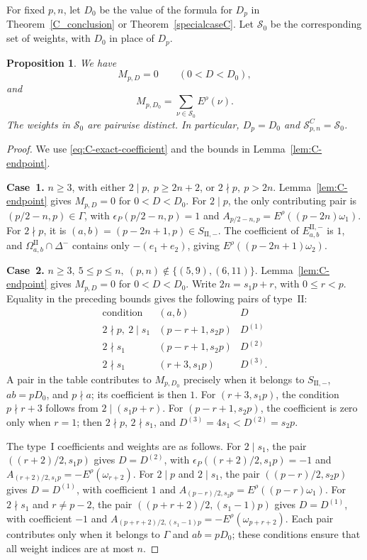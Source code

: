 \documentclass[11pt,a4paper]{amsart}
\theoremstyle{plain}
\newtheorem{prop}[theorem]{Proposition}
\numberwithin{equation}{section}
\newenvironment{pf}{\begin{proof}}{\end{proof}}
\begin{document}
For fixed \(p,n\), let \(D_0\) be the value of the formula for
\(D_p\) in Theorem~\ref{C_conclusion} or Theorem~\ref{specialcaseC}.
Let \(\mathcal S_0\) be the corresponding set of weights, with
\(D_0\) in place of \(D_p\).
\begin{prop}
	\label{prop:C-first-layer}
	We have
	\[
	M_{p,D}=0\qquad(0<D<D_0),
	\]
	and
	\[
	M_{p,D_0}
	=\sum_{\nu\in\mathcal S_0}E^\rho(\nu).
	\]
	The weights in \(\mathcal S_0\) are pairwise distinct. In particular,
	\(D_p=D_0\) and \(\mathcal S^C_{p,n}=\mathcal S_0\).
\end{prop}
\begin{pf}
	We use \eqref{eq:C-exact-coefficient} and the bounds in
	Lemma~\ref{lem:C-endpoint}.
	
	\smallskip
	
	\noindent\textbf{Case~1.} \(n\ge3\), with either
	\(2\mid p,\ p\ge2n+2\), or \(2\nmid p,\ p>2n\).
	Lemma~\ref{lem:C-endpoint} gives \(M_{p,D}=0\) for \(0<D<D_0\).
	For \(2\mid p\), the only contributing pair is
	\((p/2-n,p)\in\Gamma\), with \(\epsilon_P(p/2-n,p)=1\) and
	\(A_{p/2-n,p}=E^\rho((p-2n)\omega_1)\).
	For \(2\nmid p\), it is
	\((a,b)=(p-2n+1,p)\in S_{\mathrm{II},-}\). The coefficient of
	\(E_{a,b}^{\mathrm{II},-}\) is \(1\), and
	\(\Omega_{a,b}^{\mathrm{II}}\cap\Delta^-\) contains only
	\(-(e_1+e_2)\), giving \(E^\rho((p-2n+1)\omega_2)\).
	
	\smallskip
	
	\noindent\textbf{Case~2.} \(n\ge3,\ 5\le p\le n,\ (p,n)\notin\{(5,9),(6,11)\}\).
	Lemma~\ref{lem:C-endpoint} gives \(M_{p,D}=0\) for \(0<D<D_0\).
	Write \(2n=s_1p+r\), with \(0\le r<p\).
	Equality in the preceding bounds gives the following pairs of
	type~\(\mathrm{II}\):
	\[
	\begin{array}{c|c|c}
		\text{condition}&(a,b)&D\\ \hline
		2\nmid p,\ 2\mid s_1&(p-r+1,s_2p)&D^{(1)}\\
		2\nmid s_1&(p-r+1,s_2p)&D^{(2)}\\
		2\nmid s_1&(r+3,s_1p)&D^{(3)}.
	\end{array}
	\]
	A pair in the table contributes to \(M_{p,D_0}\) precisely when
	it belongs to \(S_{\mathrm{II},-}\), \(ab=pD_0\), and \(p\nmid a\);
	its coefficient is then \(1\).
	For \((r+3,s_1p)\), the condition \(p\nmid r+3\) follows from
	\(2\mid(s_1p+r)\). For \((p-r+1,s_2p)\), the coefficient
	is zero only when \(r=1\); then \(2\nmid p\), \(2\nmid s_1\),
	and \(D^{(3)}=4s_1<D^{(2)}=s_2p\).
	
	The type~\(\mathrm I\) coefficients and weights are as follows.
	For \(2\mid s_1\), the pair \(((r+2)/2,s_1p)\) gives
	\(D=D^{(2)}\), with \(\epsilon_P((r+2)/2,s_1p)=-1\) and
	\(A_{(r+2)/2,s_1p}=-E^\rho(\omega_{r+2})\).
	For \(2\mid p\) and \(2\mid s_1\), the pair
	\(((p-r)/2,s_2p)\) gives \(D=D^{(1)}\), with coefficient \(1\)
	and \(A_{(p-r)/2,s_2p}=E^\rho((p-r)\omega_1)\).
	For \(2\nmid s_1\) and \(r\ne p-2\), the pair
	\(((p+r+2)/2,(s_1-1)p)\) gives \(D=D^{(1)}\), with coefficient
	\(-1\) and \(A_{(p+r+2)/2,(s_1-1)p}=-E^\rho(\omega_{p+r+2})\).
	Each pair contributes only when it belongs to \(\Gamma\) and
	\(ab=pD_0\); these conditions ensure that all weight indices are
	at most \(n\).
	

\end{pf}
\end{document}
